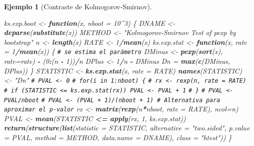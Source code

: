 \documentclass[
  spanish,
  10pt,
]{book}
\newenvironment{Shaded}{\begin{snugshade}}{\end{snugshade}}
\newcommand{\AttributeTok}[1]{\textcolor[rgb]{0.13,0.29,0.53}{#1}}
\newcommand{\CommentTok}[1]{\textcolor[rgb]{0.56,0.35,0.01}{\textit{#1}}}
\newcommand{\ControlFlowTok}[1]{\textcolor[rgb]{0.13,0.29,0.53}{\textbf{#1}}}
\newcommand{\DecValTok}[1]{\textcolor[rgb]{0.00,0.00,0.81}{#1}}
\newcommand{\FunctionTok}[1]{\textcolor[rgb]{0.13,0.29,0.53}{\textbf{#1}}}
\newcommand{\NormalTok}[1]{#1}
\newcommand{\OtherTok}[1]{\textcolor[rgb]{0.56,0.35,0.01}{#1}}
\newcommand{\SpecialCharTok}[1]{\textcolor[rgb]{0.81,0.36,0.00}{\textbf{#1}}}
\newcommand{\StringTok}[1]{\textcolor[rgb]{0.31,0.60,0.02}{#1}}
\theoremstyle{break}
\newtheorem{example}{Ejemplo}[chapter]
\theoremstyle{nonumberplain}
\renewcommand{\CommentTok}[1]{\textcolor[rgb]{0.41,0.41,0.41}{\texttt{#1}}}
\begin{document}
\begin{example}[Contraste de Kolmogorov-Smirnov]
\begin{Shaded}
\begin{Highlighting}[]
\NormalTok{ks.exp.boot }\OtherTok{\textless{}{-}} \ControlFlowTok{function}\NormalTok{(x, }\AttributeTok{nboot =} \DecValTok{10}\SpecialCharTok{\^{}}\DecValTok{3}\NormalTok{) \{}
\NormalTok{  DNAME }\OtherTok{\textless{}{-}} \FunctionTok{deparse}\NormalTok{(}\FunctionTok{substitute}\NormalTok{(x))}
\NormalTok{  METHOD }\OtherTok{\textless{}{-}} \StringTok{"Kolmogorov{-}Smirnov Test of pexp by bootstrap"} 
\NormalTok{  n }\OtherTok{\textless{}{-}} \FunctionTok{length}\NormalTok{(x)}
\NormalTok{  RATE }\OtherTok{\textless{}{-}} \DecValTok{1}\SpecialCharTok{/}\FunctionTok{mean}\NormalTok{(x)}
\NormalTok{  ks.exp.stat }\OtherTok{\textless{}{-}} \ControlFlowTok{function}\NormalTok{(x, }\AttributeTok{rate =} \DecValTok{1}\SpecialCharTok{/}\FunctionTok{mean}\NormalTok{(x)) \{ }\CommentTok{\# se estima el parámetro}
\NormalTok{    DMinus }\OtherTok{\textless{}{-}} \FunctionTok{pexp}\NormalTok{(}\FunctionTok{sort}\NormalTok{(x), }\AttributeTok{rate=}\NormalTok{rate) }\SpecialCharTok{{-}}\NormalTok{ (}\DecValTok{0}\SpecialCharTok{:}\NormalTok{(n }\SpecialCharTok{{-}} \DecValTok{1}\NormalTok{))}\SpecialCharTok{/}\NormalTok{n}
\NormalTok{    DPlus }\OtherTok{\textless{}{-}} \DecValTok{1}\SpecialCharTok{/}\NormalTok{n }\SpecialCharTok{{-}}\NormalTok{ DMinus}
\NormalTok{    Dn }\OtherTok{=} \FunctionTok{max}\NormalTok{(}\FunctionTok{c}\NormalTok{(DMinus, DPlus))}
\NormalTok{  \}  }
\NormalTok{  STATISTIC }\OtherTok{\textless{}{-}} \FunctionTok{ks.exp.stat}\NormalTok{(x, }\AttributeTok{rate =}\NormalTok{ RATE) }
  \FunctionTok{names}\NormalTok{(STATISTIC) }\OtherTok{\textless{}{-}} \StringTok{"Dn"}
  \CommentTok{\# PVAL \textless{}{-} 0}
  \CommentTok{\# for(i in 1:nboot) \{}
  \CommentTok{\#   rx \textless{}{-} rexp(n, rate = RATE)}
  \CommentTok{\#   if (STATISTIC \textless{}= ks.exp.stat(rx)) PVAL \textless{}{-} PVAL + 1}
  \CommentTok{\# \}}
  \CommentTok{\# PVAL \textless{}{-} PVAL/nboot}
  \CommentTok{\# PVAL \textless{}{-} (PVAL + 1)/(nboot + 1) \# Alternativa para aproximar el p{-}valor}
\NormalTok{  rx }\OtherTok{\textless{}{-}} \FunctionTok{matrix}\NormalTok{(}\FunctionTok{rexp}\NormalTok{(n}\SpecialCharTok{*}\NormalTok{nboot, }\AttributeTok{rate =}\NormalTok{ RATE), }\AttributeTok{ncol=}\NormalTok{n)}
\NormalTok{  PVAL }\OtherTok{\textless{}{-}} \FunctionTok{mean}\NormalTok{(STATISTIC }\SpecialCharTok{\textless{}=} \FunctionTok{apply}\NormalTok{(rx, }\DecValTok{1}\NormalTok{, ks.exp.stat))}
  \FunctionTok{return}\NormalTok{(}\FunctionTok{structure}\NormalTok{(}\FunctionTok{list}\NormalTok{(}\AttributeTok{statistic =}\NormalTok{ STATISTIC, }\AttributeTok{alternative =} \StringTok{"two.sided"}\NormalTok{, }
                   \AttributeTok{p.value =}\NormalTok{ PVAL, }\AttributeTok{method =}\NormalTok{ METHOD, }\AttributeTok{data.name =}\NormalTok{ DNAME), }
                   \AttributeTok{class =} \StringTok{"htest"}\NormalTok{))}
\NormalTok{\}}
\end{Highlighting}
\end{Shaded}


\end{example}
\end{document}
